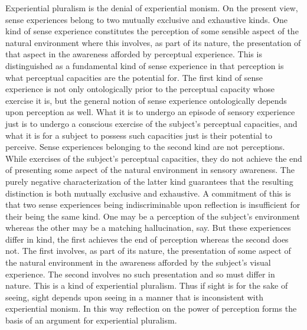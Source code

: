 \documentclass[12pt]{article}
\begin{document}
Experiential pluralism is the denial of experiential monism. On the present view, sense experiences belong to two mutually exclusive and exhaustive kinds. One kind of sense experience constitutes the perception of some sensible aspect of the natural environment where this involves, as part of its nature, the presentation of that aspect in the awareness afforded by perceptual experience. This is distinguished as a fundamental kind of sense experience in that perception is what perceptual capacities are the potential for. The first kind of sense experience is not only ontologically prior to the perceptual capacity whose exercise it is, but the general notion of sense experience ontologically depends upon perception as well. What it is to undergo an episode of sensory experience just is to undergo a conscious exercise of the subject’s perceptual capacities, and what it is for a subject to possess such capacities just is their potential to perceive. Sense experiences belonging to the second kind are not perceptions. While exercises of the subject's perceptual capacities, they do not achieve the end of presenting some aspect of the natural environment in sensory awareness. The purely negative characterization of the latter kind guarantees that the resulting distinction is both mutually exclusive and exhaustive. A commitment of this is that two sense experiences being indiscriminable upon reflection is insufficient for their being the same kind. One may be a perception of the subject's environment whereas the other may be a matching hallucination, say. But these experiences differ in kind, the first achieves the end of perception whereas the second does not. The first involves, as part of its nature, the presentation of some aspect of the natural environment in the awareness afforded by the subject's visual experience. The second involves no such presentation and so must differ in nature. This is a kind of experiential pluralism. Thus if sight is for the sake of seeing, sight depends upon seeing in a manner that is inconsistent with experiential monism. In this way reflection on the power of perception forms the basis of an argument for experiential pluralism.
\end{document}
